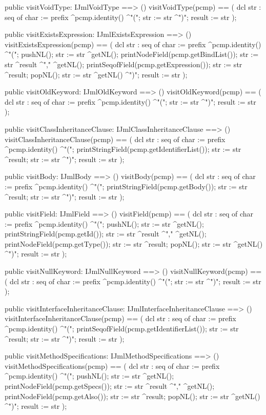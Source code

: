 \begin{vdm_al}
  public visitVoidType: IJmlVoidType ==> ()
  visitVoidType(pcmp) ==
    ( dcl str : seq of char := prefix ^pcmp.identity() ^"(";
      str := str ^")";
      result := str );

  public visitExistsExpression: IJmlExistsExpression ==> ()
  visitExistsExpression(pcmp) ==
    ( dcl str : seq of char := prefix ^pcmp.identity() ^"(";
      pushNL();
      str := str ^getNL();
      printNodeField(pcmp.getBindList());
      str := str ^result ^"," ^getNL();
      printSeqofField(pcmp.getExpression());
      str := str ^result;
      popNL();
      str := str ^getNL() ^")";
      result := str );

  public visitOldKeyword: IJmlOldKeyword ==> ()
  visitOldKeyword(pcmp) ==
    ( dcl str : seq of char := prefix ^pcmp.identity() ^"(";
      str := str ^")";
      result := str );

  public visitClassInheritanceClause: IJmlClassInheritanceClause ==> ()
  visitClassInheritanceClause(pcmp) ==
    ( dcl str : seq of char := prefix ^pcmp.identity() ^"(";
      printStringField(pcmp.getIdentifierList());
      str := str ^result;
      str := str ^")";
      result := str );

  public visitBody: IJmlBody ==> ()
  visitBody(pcmp) ==
    ( dcl str : seq of char := prefix ^pcmp.identity() ^"(";
      printStringField(pcmp.getBody());
      str := str ^result;
      str := str ^")";
      result := str );

  public visitField: IJmlField ==> ()
  visitField(pcmp) ==
    ( dcl str : seq of char := prefix ^pcmp.identity() ^"(";
      pushNL();
      str := str ^getNL();
      printStringField(pcmp.getId());
      str := str ^result ^"," ^getNL();
      printNodeField(pcmp.getType());
      str := str ^result;
      popNL();
      str := str ^getNL() ^")";
      result := str );

  public visitNullKeyword: IJmlNullKeyword ==> ()
  visitNullKeyword(pcmp) ==
    ( dcl str : seq of char := prefix ^pcmp.identity() ^"(";
      str := str ^")";
      result := str );

  public visitInterfaceInheritanceClause: IJmlInterfaceInheritanceClause ==> ()
  visitInterfaceInheritanceClause(pcmp) ==
    ( dcl str : seq of char := prefix ^pcmp.identity() ^"(";
      printSeqofField(pcmp.getIdentifierList());
      str := str ^result;
      str := str ^")";
      result := str );

  public visitMethodSpecifications: IJmlMethodSpecifications ==> ()
  visitMethodSpecifications(pcmp) ==
    ( dcl str : seq of char := prefix ^pcmp.identity() ^"(";
      pushNL();
      str := str ^getNL();
      printNodeField(pcmp.getSpecs());
      str := str ^result ^"," ^getNL();
      printNodeField(pcmp.getAlso());
      str := str ^result;
      popNL();
      str := str ^getNL() ^")";
      result := str );


\end{vdm_al}
